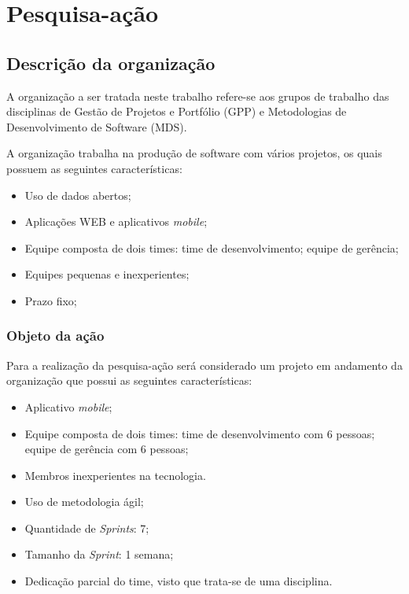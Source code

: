 \chapter{Pesquisa-ação}
\label{pesquisa_acao}
	\section{Descrição da organização}

		A organização a ser tratada neste trabalho refere-se aos grupos de trabalho das disciplinas de Gestão de Projetos 
		e Portfólio (GPP) e Metodologias de Desenvolvimento de Software (MDS).

		A organização trabalha na produção de software com vários projetos, os quais possuem as seguintes características:

		\begin{itemize}
			\item Uso de dados abertos;
			\item Aplicações WEB e aplicativos \textit{mobile};
			\item Equipe composta de dois times:
				 time de desenvolvimento;
				 equipe de gerência;
			\item Equipes pequenas e inexperientes;
			\item Prazo fixo;
		\end{itemize}

		\subsection{Objeto da ação}

		Para a realização da pesquisa-ação será considerado um projeto em andamento da organização que possui as seguintes características:


		\begin{itemize}
			\item Aplicativo \textit{mobile};
			\item Equipe composta de dois times:
				 time de desenvolvimento com 6 pessoas;
				 equipe de gerência com 6 pessoas;
			\item Membros inexperientes na tecnologia.
			\item Uso de metodologia ágil;
			\item Quantidade de \textit{Sprints}: 7;
			\item Tamanho da \textit{Sprint}: 1 semana;
			\item Dedicação parcial do time, visto que trata-se de uma disciplina.
		\end{itemize}

